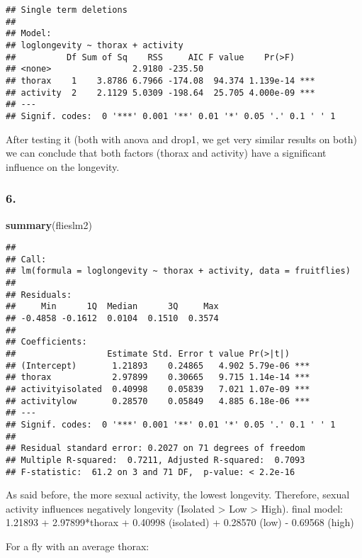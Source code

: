 \documentclass[11pt,]{article}
\newenvironment{Shaded}{\begin{snugshade}}{\end{snugshade}}
\newcommand{\KeywordTok}[1]{\textcolor[rgb]{0.13,0.29,0.53}{\textbf{{#1}}}}
\newcommand{\NormalTok}[1]{{#1}}
\begin{document}
\begin{verbatim}
## Single term deletions
## 
## Model:
## loglongevity ~ thorax + activity
##          Df Sum of Sq    RSS     AIC F value    Pr(>F)    
## <none>                2.9180 -235.50                      
## thorax    1    3.8786 6.7966 -174.08  94.374 1.139e-14 ***
## activity  2    2.1129 5.0309 -198.64  25.705 4.000e-09 ***
## ---
## Signif. codes:  0 '***' 0.001 '**' 0.01 '*' 0.05 '.' 0.1 ' ' 1
\end{verbatim}

After testing it (both with anova and drop1, we get very similar results
on both) we can conclude that both factors (thorax and activity) have a
significant influence on the longevity.

\subsubsection{6.}\label{section-4}

\begin{Shaded}
\begin{Highlighting}[]
\KeywordTok{summary}\NormalTok{(flieslm2)}
\end{Highlighting}
\end{Shaded}

\begin{verbatim}
## 
## Call:
## lm(formula = loglongevity ~ thorax + activity, data = fruitflies)
## 
## Residuals:
##     Min      1Q  Median      3Q     Max 
## -0.4858 -0.1612  0.0104  0.1510  0.3574 
## 
## Coefficients:
##                  Estimate Std. Error t value Pr(>|t|)    
## (Intercept)       1.21893    0.24865   4.902 5.79e-06 ***
## thorax            2.97899    0.30665   9.715 1.14e-14 ***
## activityisolated  0.40998    0.05839   7.021 1.07e-09 ***
## activitylow       0.28570    0.05849   4.885 6.18e-06 ***
## ---
## Signif. codes:  0 '***' 0.001 '**' 0.01 '*' 0.05 '.' 0.1 ' ' 1
## 
## Residual standard error: 0.2027 on 71 degrees of freedom
## Multiple R-squared:  0.7211, Adjusted R-squared:  0.7093 
## F-statistic:  61.2 on 3 and 71 DF,  p-value: < 2.2e-16
\end{verbatim}

As said before, the more sexual activity, the lowest longevity.
Therefore, sexual activity influences negatively longevity (Isolated
\textgreater{} Low \textgreater{} High). final model: 1.21893 +
2.97899*thorax + 0.40998 (isolated) + 0.28570 (low) - 0.69568 (high)

For a fly with an average thorax:
\end{document}
